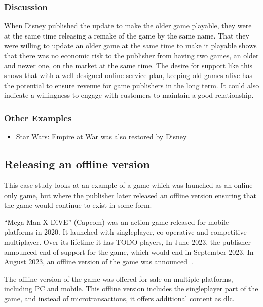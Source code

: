 \subsubsection*{Discussion}
When Disney published the update to make the older game playable, they were at the same time releasing a remake of the game by the same name.
That they were willing to update an older game at the same time to make it playable shows that there was no economic risk to the publisher from having two games, an older and newer one, on the market at the same time.
The desire for support like this shows that with a well designed online service plan, keeping old games alive has the potential to ensure revenue for game publishers in the long term.
It could also indicate a willingness to engage with customers to maintain a good relationship.

\subsubsection*{Other Examples}
\begin{itemize}
    \item Star Wars: Empire at War was also restored by Disney
\end{itemize}

\subsection{Releasing an offline version}
This case study looks at an example of a game which was launched as an online only game,
but where the publisher later released an offline version ensuring that the game would continue to exist in some form.

``Mega Man X DiVE'' (Capcom) was an action game released for mobile platforms in 2020.
It launched with singleplayer, co-operative and competitive multiplayer.
Over its lifetime it has TODO players\cn,
In June 2023, the publisher announced end of support for the game, which would end in September 2023\cite{megaman-eos-2023}.
In August 2023, an offline version of the game was announced~\cite{megaman-offline}.

The offline version of the game was offered for sale on multiple platforms, including PC and mobile.
This offline version includes the singleplayer part of the game, and instead of microtransactions, it offers additional content as \gls{dlc}.

